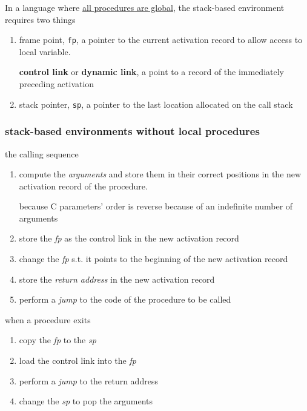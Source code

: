 \documentclass[11pt]{article}
\begin{document}
In a language where \uline{all procedures are global}, the stack-based environment
requires two things
\begin{enumerate}
\item frame point, \texttt{fp}, a pointer to the current activation record to allow
access to local variable.

\textbf{control link} or \textbf{dynamic link}, a point to a record of the immediately
preceding activation
\item stack pointer, \texttt{sp}, a pointer to the last location allocated on the call stack
\end{enumerate}
\subsubsection{stack-based environments without local procedures}
\label{sec:org132c02a}
the calling sequence
\begin{enumerate}
\item compute the \emph{arguments} and store them in their correct positions in the
new activation record of the procedure.

because C parameters' order is reverse because of an indefinite number of
arguments
\item store the \emph{fp} as the control link in the new activation record
\item change the \emph{fp} s.t. it points to the beginning of the new activation
record
\item store the \emph{return address} in the new activation record
\item perform a \emph{jump} to the code of the procedure to be called
\end{enumerate}


when a procedure exits
\begin{enumerate}
\item copy the \emph{fp} to the \emph{sp}
\item load the control link into the \emph{fp}
\item perform a \emph{jump} to the return address
\item change the \emph{sp} to pop the arguments
\end{enumerate}
\end{document}
